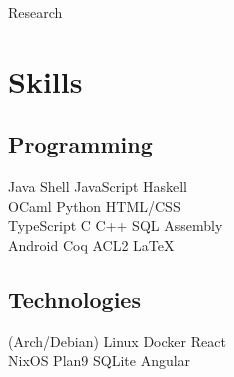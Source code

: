 \documentclass[letterpaper]{resume} %
\begin{document}
\begin{minipage}[t]{0.33\textwidth}
Research
\sectionspace


\section{Skills}

\subsection{Programming}
Java \textbullet{} Shell \textbullet{} JavaScript \textbullet{} Haskell \\
OCaml \textbullet{} Python \textbullet{} HTML/CSS \\
TypeScript \textbullet{}  C \textbullet{} C++ \textbullet{} SQL \textbullet{} Assembly \\
Android  \textbullet{} Coq \textbullet{} ACL2 \textbullet{} \LaTeX\ \\
\sectionspace

\subsection{Technologies}
(Arch/Debian) Linux  \textbullet{} Docker \textbullet{} React \\
NixOS \textbullet{} Plan9 \textbullet{} SQLite \textbullet{} Angular \\
\sectionspace

\end{minipage} %
\hfill
%
%
\end{document}
